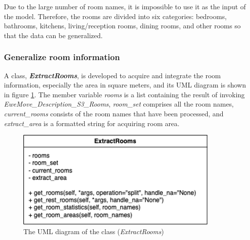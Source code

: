 \documentclass[12pt,twoside]{report}
\begin{document}
Due to the large number of room names, it is impossible to use it as the input of the model. Therefore, the rooms are divided into six categories: bedrooms, bathrooms, kitchens, living/reception rooms, dining rooms, and other rooms so that the data can be generalized. 
\\

\subsubsection{Generalize room information}
A class, \textit{\textbf{ExtractRooms}}, is developed to acquire and integrate the room information, especially the area in square meters, and its UML diagram is shown in figure \ref{uml_extract_rooms}. The member variable \textit{rooms} is a list containing the result of invoking \textit{EweMove\_Description\_S3\_Rooms}, \textit{room\_set} comprises all the room names, \textit{current\_rooms} consists of the room names that have been processed, and \textit{extract\_area} is a formatted string for acquiring room area. 
\\

\begin{figure}[!htbp]
	\centering
	\includegraphics[width=10cm]{uml_extract_rooms}
	\caption{The UML diagram of the class (\textit{ExtractRooms})}
	\label{uml_extract_rooms}
\end{figure}
\end{document}

